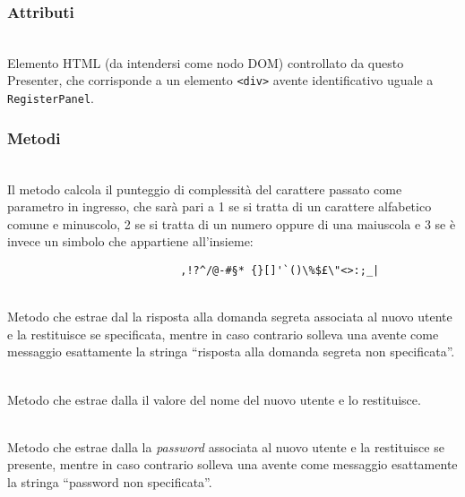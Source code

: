 \subsubsection*{Attributi}
\begin{description}
  \item{}\\
  Elemento HTML (da intendersi come nodo DOM) controllato da questo Presenter, che corrisponde a un elemento \verb'<div>' avente identificativo uguale a \verb'RegisterPanel'.
\end{description}

\subsubsection*{Metodi}
\begin{description}

	\item{}\\
	Il metodo calcola il punteggio di complessità del carattere passato come parametro in ingresso, che sarà pari a 1 se si tratta di un carattere alfabetico comune e minuscolo, 2 se si tratta di un numero oppure di una maiuscola e 3 se è invece un simbolo che appartiene all'insieme:
\begin{verbatim}
	                       ,!?^/@-#§* {}[]'`()\%$£\"<>:;_|
\end{verbatim}

	\item{}\\
	Metodo che estrae dal  la risposta alla domanda segreta associata al nuovo utente e la restituisce se specificata, mentre in caso contrario solleva una  avente come messaggio esattamente la stringa ``risposta alla domanda segreta non specificata''.
	
	\item{}\\
	Metodo che estrae dalla  il valore del nome del nuovo utente e lo restituisce.
	
		\item{}\\
	Metodo che estrae dalla  la \textit{password} associata al nuovo utente e la restituisce se presente, mentre in caso contrario solleva una  avente come messaggio esattamente la stringa ``password non specificata''.
	

\end{description}
